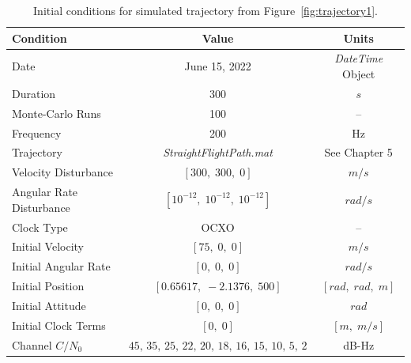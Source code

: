 \begin{table}[!ht]
    \caption{Initial conditions for simulated trajectory from Figure~\ref{fig:trajectory1}.}\label{tbl:trajectory}
    \centering
    \begin{tabular}{lcc}
        \toprule
        \textbf{Condition}       & \textbf{Value}                                      & \textbf{Units}                     \\
        \midrule
        Date                     & June 15, 2022                                       & \textit{DateTime} Object           \\
        Duration                 & 300                                                 & \(s\)                              \\
        Monte-Carlo Runs         & 100                                                 & {--}                               \\
        Frequency                & 200                                                 & Hz                                 \\
        Trajectory               & \textit{StraightFlightPath.mat}                     & See Chapter 5                      \\
        Velocity Disturbance     & \(\left[300, \; 300, \; 0\right]\)                  & \(m/s\)                            \\
        Angular Rate Disturbance & \(\left[10^{-12}, \; 10^{-12}, \; 10^{-12}\right]\) & \(rad/s\)                          \\
        Clock Type               & OCXO                                                & {--}                               \\
        Initial Velocity         & \(\left[75, \; 0, \; 0\right]\)                     & \(m/s\)                            \\
        Initial Angular Rate     & \(\left[0, \; 0, \; 0\right]\)                      & \(rad/s\)                          \\
        Initial Position         & \(\left[0.65617, \; -2.1376, \; 500\right]\)        & \(\left[rad, \; rad, \; m\right]\) \\
        Initial Attitude         & \(\left[0, \; 0, \; 0\right]\)                      & \(rad\)                            \\
        Initial Clock Terms      & \(\left[0, \; 0\right]\)                            & \(\left[m, \; m/s\right]\)         \\
        Channel \(C/N_0\)        & \(45,\,35,\,25,\,22,\,20,\,18,\,16,\,15,\,10,\,5,\,2\)                & dB-Hz                              \\

        \bottomrule
    \end{tabular}
\end{table}

